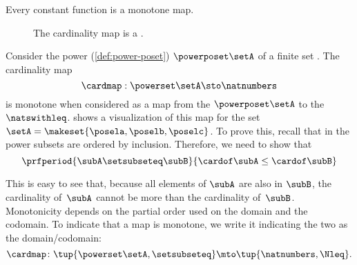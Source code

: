 \begin{example}
    Every constant function is a monotone map.
\end{example}

\begin{figure*}[b]
    \centering
    \caption{The cardinality map is a .}
    \label{fig:cardinality}
\end{figure*}

\begin{example}\label{exa:cardinality}
    Consider the power  (\cref{def:power-poset}) $\powerposet\setA$ of a finite set \setA.
    The cardinality map
    \begin{equation}\label{eq:cardinality-map}
        \cardmap : \powerset\setA \sto \natnumbers
    \end{equation}
    is monotone when considered as a map from the  $\powerposet\setA$ to the  $\natswithleq$.
     shows a visualization of this map for the set~$\setA=\makeset{\posela,\poselb,\poselc}$.
    To prove this, recall that in the power  subsets are ordered by inclusion.
    Therefore, we need to show that
    \begin{equation}\label{eq:cardinality}
        \prfperiod{
            \subA \setsubseteq \subB
        }{
            \cardof \subA \leq \cardof \subB
        }
    \end{equation}

    This is easy to see that, because all elements of $\subA$ are also in $\subB$, the cardinality of~$\subA$ cannot be more than the cardinality of~$\subB$.
    Monotonicity depends on the partial order used on the domain and the codomain.
    To indicate that a map is monotone, we write it indicating the two  as the domain/codomain:
    \begin{equation}\label{eq:cardinality-as-posmap}
        \cardmap \colon \tup{\powerset\setA, \setsubseteq} \mto \tup{\natnumbers, {{\Nleq}}}.
    \end{equation}
\end{example}

